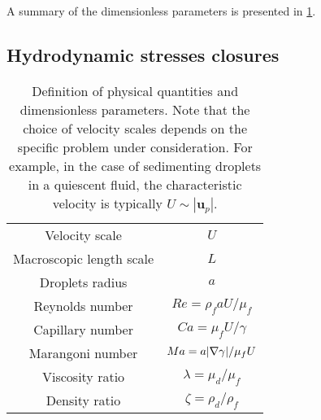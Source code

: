 A summary of the dimensionless parameters is presented in \ref{tab:dimensionless_para}. 


\subsection{Hydrodynamic stresses closures}


\begin{table}
    \centering
\begin{tabular}{|c|c|}\hline
    Velocity scale & $U$ \\
    Macroscopic length scale & $L$ \\
    Droplets radius & $a$ \\
    Reynolds number & $Re = \rho_f a U / \mu_f$   \\
    Capillary number & $Ca = \mu_f U / \gamma$ \\
    Marangoni number & $Ma =  a|\mathbf{\nabla}\gamma| / \mu_f U$ \\\hline
Viscosity ratio & $\lambda = \mu_d / \mu_f$ \\
Density ratio & $\zeta = \rho_d / \rho_f$ \\
\hline
    \end{tabular}
    \caption{Definition of physical quantities and dimensionless parameters.
    Note that the choice of velocity scales depends on the specific problem under consideration. 
    For example, in the case of sedimenting droplets in a quiescent fluid, the characteristic velocity is typically $U \sim |\textbf{u}_p|$.}
    \label{tab:dimensionless_para}
\end{table}



